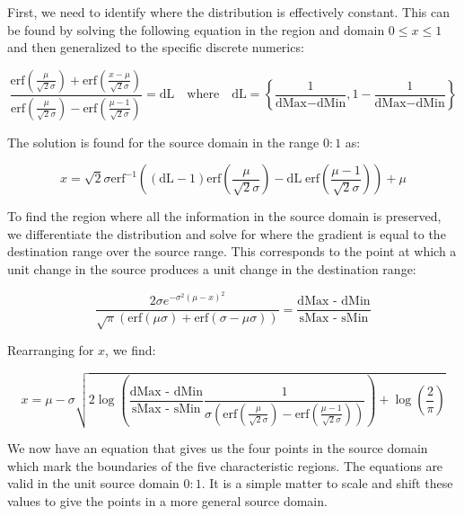 First, we need to identify where the distribution is effectively constant. This can be found by solving the following equation in the region and domain $0 \le x \le 1$ and then generalized to the specific discrete numerics:

\begin{equation}\label{eq:0to1}
 \frac{\text{erf}\left(\frac{\mu }{\sqrt{2} \sigma }\right)+\text{erf}\left(\frac{x-\mu }{\sqrt{2} \sigma }\right)}{\text{erf}\left(\frac{\mu }{\sqrt{2} \sigma }\right)-\text{erf}\left(\frac{\mu -1}{\sqrt{2} \sigma }\right)}=\text{dL} \quad \text{where} \quad \text{dL} = \left\{ \frac{1}{\text{dMax} - \text{dMin}}, 1 - \frac{1}{\text{dMax} - \text{dMin}} \right\}
\end{equation}


The solution is found for the source domain in the range $0:1$ as:


\begin{equation}\label{eq:LowHigh}
 x = \sqrt{2} \sigma  \text{erf}^{-1}\left((\text{dL}-1) \text{erf}\left(\frac{\mu }{\sqrt{2} \sigma }\right)-\text{dL} \; \text{erf}\left(\frac{\mu -1}{\sqrt{2} \sigma }\right)\right)+\mu
\end{equation}

To find the region where all the information in the source domain is preserved, we differentiate the distribution and solve for where the gradient is equal to the destination range over the source range. This corresponds to the point at which a unit change in the source produces a unit change in the destination range:

\begin{equation}\label{eq:Boundaries}
\frac{2 \sigma e^{-\sigma^2 (\mu-x)^2}}{\sqrt{\pi } (\text{erf}(\mu \sigma)+\text{erf}(\sigma-\mu \sigma))}=\frac{\text{dMax - dMin}}{\text{sMax - sMin}}
\end{equation}

Rearranging for $x$, we find:

\begin{equation}\label{eq:PreservedRegion}
 x=\mu -\sigma  \sqrt{2 \log \left( \frac{\text{dMax - dMin}}{\text{sMax - sMin}} \frac{1}{ \sigma  \left(\text{erf}\left(\frac{\mu }{\sqrt{2} \sigma }\right)-\text{erf}\left(\frac{\mu -1}{\sqrt{2} \sigma }\right)\right)}\right)+\log \left(\frac{2}{\pi }\right)}
\end{equation}

We now have an equation that gives us the four points in the source domain which mark the boundaries of the five characteristic regions. The equations are valid in the unit source domain $0:1$. It is a simple matter to scale and shift these values to give the points in a more general source domain.


